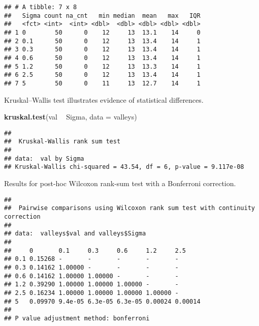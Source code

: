 \documentclass[]{book}
\newenvironment{Shaded}{\begin{snugshade}}{\end{snugshade}}
\newcommand{\DataTypeTok}[1]{\textcolor[rgb]{0.13,0.29,0.53}{#1}}
\newcommand{\KeywordTok}[1]{\textcolor[rgb]{0.13,0.29,0.53}{\textbf{#1}}}
\newcommand{\NormalTok}[1]{#1}
\newcommand{\OperatorTok}[1]{\textcolor[rgb]{0.81,0.36,0.00}{\textbf{#1}}}
\newcommand{\OtherTok}[1]{\textcolor[rgb]{0.56,0.35,0.01}{#1}}
\newcommand{\StringTok}[1]{\textcolor[rgb]{0.31,0.60,0.02}{#1}}
\begin{document}
\begin{verbatim}
## # A tibble: 7 x 8
##   Sigma count na_cnt   min median  mean   max   IQR
##   <fct> <int>  <int> <dbl>  <dbl> <dbl> <dbl> <dbl>
## 1 0        50      0    12     13  13.1    14     0
## 2 0.1      50      0    12     13  13.4    14     1
## 3 0.3      50      0    12     13  13.4    14     1
## 4 0.6      50      0    12     13  13.4    14     1
## 5 1.2      50      0    12     13  13.3    14     1
## 6 2.5      50      0    12     13  13.4    14     1
## 7 5        50      0    11     13  12.7    14     1
\end{verbatim}

Kruskal--Wallis test illustrates evidence of statistical differences.

\begin{Shaded}
\begin{Highlighting}[]
\KeywordTok{kruskal.test}\NormalTok{(val }\OperatorTok{~}\StringTok{ }\NormalTok{Sigma, }\DataTypeTok{data =}\NormalTok{ valleys)}
\end{Highlighting}
\end{Shaded}

\begin{verbatim}
## 
##  Kruskal-Wallis rank sum test
## 
## data:  val by Sigma
## Kruskal-Wallis chi-squared = 43.54, df = 6, p-value = 9.117e-08
\end{verbatim}

Results for post-hoc Wilcoxon rank-sum test with a Bonferroni correction.

\begin{Shaded}
\end{Shaded}

\begin{verbatim}
## 
##  Pairwise comparisons using Wilcoxon rank sum test with continuity correction 
## 
## data:  valleys$val and valleys$Sigma 
## 
##     0       0.1     0.3     0.6     1.2     2.5    
## 0.1 0.15268 -       -       -       -       -      
## 0.3 0.14162 1.00000 -       -       -       -      
## 0.6 0.14162 1.00000 1.00000 -       -       -      
## 1.2 0.39290 1.00000 1.00000 1.00000 -       -      
## 2.5 0.16234 1.00000 1.00000 1.00000 1.00000 -      
## 5   0.09970 9.4e-05 6.3e-05 6.3e-05 0.00024 0.00014
## 
## P value adjustment method: bonferroni
\end{verbatim}
\end{document}
